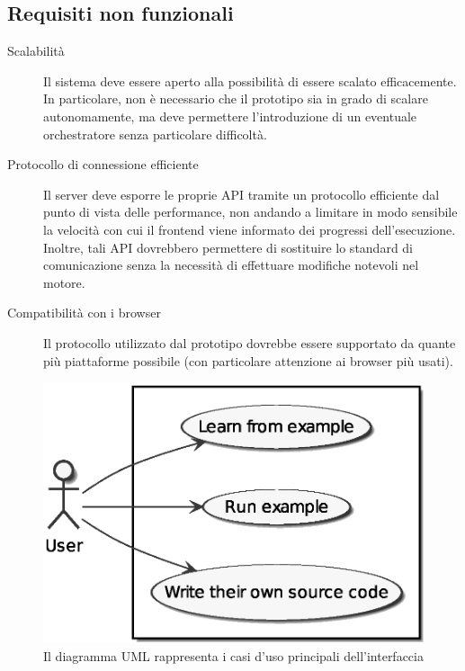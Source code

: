     \subsection{Requisiti non funzionali}

    \begin{description}
      \item[Scalabilità]
        Il sistema deve essere aperto alla possibilità di essere scalato efficacemente.
        In particolare, non è necessario che il prototipo sia in grado di scalare autonomamente, ma deve permettere l'introduzione di un eventuale orchestratore senza particolare difficoltà.

      \item[Protocollo di connessione efficiente]
        Il server deve esporre le proprie API tramite un protocollo efficiente dal punto di vista delle performance, non andando a limitare in modo sensibile la velocità con cui il frontend viene informato dei progressi dell'esecuzione.
        Inoltre, tali API dovrebbero permettere di sostituire lo standard di comunicazione senza la necessità di effettuare modifiche notevoli nel motore.

      \item[Compatibilità con i browser]
        Il protocollo utilizzato dal prototipo dovrebbe essere supportato da quante più piattaforme possibile (con particolare attenzione ai browser più usati).
    \end{description}


    \begin{figure}[htbp]
      \centering
      \includegraphics[width=.6\textwidth]{res/uml/use-cases-frontend.eps}%
      \caption{Il diagramma UML rappresenta i casi d'uso principali dell'interfaccia}%
      \label{fig:uml-use-case}
    \end{figure}
